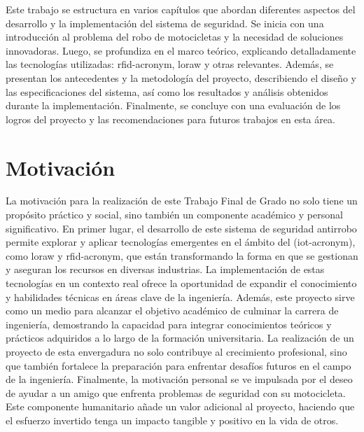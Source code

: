 Este trabajo se estructura en varios capítulos que abordan diferentes aspectos del desarrollo y la implementación del sistema de seguridad. Se inicia con una introducción al problema del robo de motocicletas y la necesidad de soluciones innovadoras. Luego, se profundiza en el marco teórico, explicando detalladamente las tecnologías utilizadas: \acrshort{rfid-acronym}, \acrshort{loraw} y otras relevantes. Además, se presentan los antecedentes y la metodología del proyecto, describiendo el diseño y las especificaciones del sistema, así como los resultados y análisis obtenidos durante la implementación. Finalmente, se concluye con una evaluación de los logros del proyecto y las recomendaciones para futuros trabajos en esta área.


\section{Motivación}
La motivación para la realización de este Trabajo Final de Grado no solo tiene un propósito práctico y social, sino también un componente académico y personal significativo.
En primer lugar, el desarrollo de este sistema de seguridad antirrobo permite explorar y aplicar tecnologías emergentes en el ámbito del (\acrshort{iot-acronym}), como \acrshort{loraw} y \acrshort{rfid-acronym}, que están transformando la forma en que se gestionan y aseguran los recursos en diversas industrias. La implementación de estas tecnologías en un contexto real ofrece la oportunidad de expandir el conocimiento y habilidades técnicas en áreas clave de la ingeniería.
Además, este proyecto sirve como un medio para alcanzar el objetivo académico de culminar la carrera de ingeniería, demostrando la capacidad para integrar conocimientos teóricos y prácticos adquiridos a lo largo de la formación universitaria. La realización de un proyecto de esta envergadura no solo contribuye al crecimiento profesional, sino que también fortalece la preparación para enfrentar desafíos futuros en el campo de la ingeniería.
Finalmente, la motivación personal se ve impulsada por el deseo de ayudar a un amigo que enfrenta problemas de seguridad con su motocicleta. Este componente humanitario añade un valor adicional al proyecto, haciendo que el esfuerzo invertido tenga un impacto tangible y positivo en la vida de otros.



